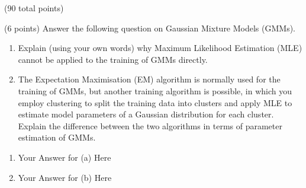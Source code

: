 \documentclass[12pt]{article}
\begin{document}
\begin{question}{(90 total points) \qTwoTitle}
\begin{subquestion}{(6 points)
    Answer the following question on Gaussian Mixture Models (GMMs).
  } \label{q2:gmm-1}
  \begin{enumerate}\NARROWITEM
  \item Explain (using your own words) why Maximum Likelihood Estimation (MLE) cannot be applied to the training of GMMs directly.
  \item The Expectation Maximisation (EM) algorithm is normally used for the training of GMMs, but another training algorithm is possible, in which you employ \kmeans clustering to split the training data into clusters and apply MLE to estimate model parameters of a Gaussian distribution for each cluster. Explain the difference between the two algorithms in terms of parameter estimation of GMMs.
    \end{enumerate}
   

  \begin{answerbox}{0.6\textheight}
    \begin{enumerate}
    \item Your Answer for (a) Here
    \item Your Answer for (b) Here
    \end{enumerate}
  \end{answerbox}
  


\end{subquestion}



\end{question}
\end{document}
